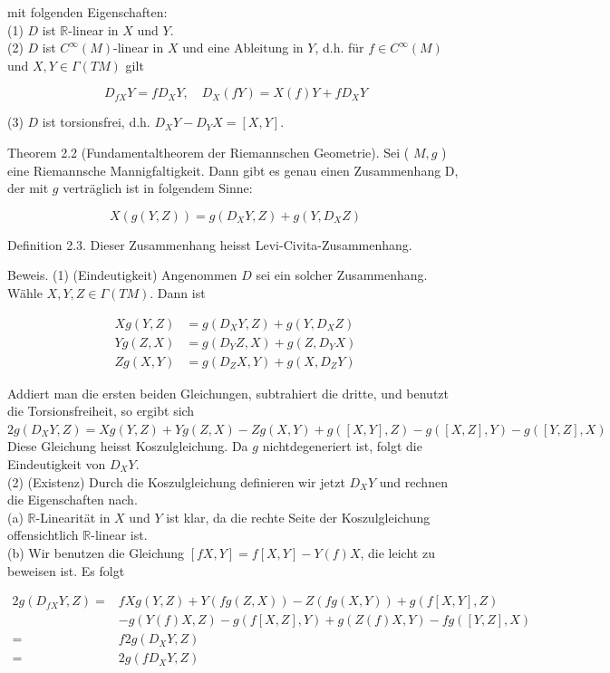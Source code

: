 \documentclass[10pt, letterpaper]{article}
\begin{document}
mit folgenden Eigenschaften:\\
(1) $D$ ist $\mathbb{R}$-linear in $X$ und $Y$.\\
(2) $D$ ist $C^{\infty}(M)$-linear in $X$ und eine Ableitung in $Y$, d.h. für $f \in C^{\infty}(M)$ und $X, Y \in \Gamma(T M)$ gilt

$$
D_{f X} Y=f D_{X} Y, \quad D_{X}(f Y)=X(f) Y+f D_{X} Y
$$

(3) $D$ ist torsionsfrei, d.h. $D_{X} Y-D_{Y} X=[X, Y]$.

Theorem 2.2 (Fundamentaltheorem der Riemannschen Geometrie). Sei ( $M, g$ ) eine Riemannsche Mannigfaltigkeit. Dann gibt es genau einen Zusammenhang D, der mit $g$ verträglich ist in folgendem Sinne:

$$
X(g(Y, Z))=g\left(D_{X} Y, Z\right)+g\left(Y, D_{X} Z\right)
$$

Definition 2.3. Dieser Zusammenhang heisst Levi-Civita-Zusammenhang.

Beweis. (1) (Eindeutigkeit) Angenommen $D$ sei ein solcher Zusammenhang. Wähle $X, Y, Z \in \Gamma(T M)$. Dann ist

$$
\begin{aligned}
X g(Y, Z) & =g\left(D_{X} Y, Z\right)+g\left(Y, D_{X} Z\right) \\
Y g(Z, X) & =g\left(D_{Y} Z, X\right)+g\left(Z, D_{Y} X\right) \\
Z g(X, Y) & =g\left(D_{Z} X, Y\right)+g\left(X, D_{Z} Y\right)
\end{aligned}
$$

Addiert man die ersten beiden Gleichungen, subtrahiert die dritte, und benutzt die Torsionsfreiheit, so ergibt sich\\
$2 g\left(D_{X} Y, Z\right)=X g(Y, Z)+Y g(Z, X)-Z g(X, Y)+g([X, Y], Z)-g([X, Z], Y)-g([Y, Z], X)$\\
Diese Gleichung heisst Koszulgleichung. Da $g$ nichtdegeneriert ist, folgt die Eindeutigkeit von $D_{X} Y$.\\
(2) (Existenz) Durch die Koszulgleichung definieren wir jetzt $D_{X} Y$ und rechnen die Eigenschaften nach.\\
(a) $\mathbb{R}$-Linearität in $X$ und $Y$ ist klar, da die rechte Seite der Koszulgleichung offensichtlich $\mathbb{R}$-linear ist.\\
(b) Wir benutzen die Gleichung $[f X, Y]=f[X, Y]-Y(f) X$, die leicht zu beweisen ist. Es folgt

$$
\begin{aligned}
2 g\left(D_{f X} Y, Z\right)= & f X g(Y, Z)+Y(f g(Z, X))-Z(f g(X, Y))+g(f[X, Y], Z) \\
& -g(Y(f) X, Z)-g(f[X, Z], Y)+g(Z(f) X, Y)-f g([Y, Z], X) \\
= & f 2 g\left(D_{X} Y, Z\right) \\
= & 2 g\left(f D_{X} Y, Z\right)
\end{aligned}
$$
\end{document}
